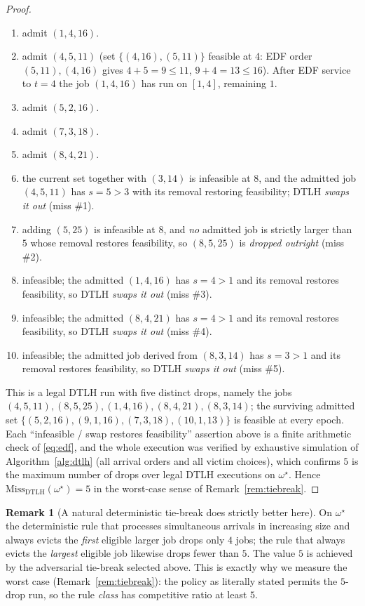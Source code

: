 \documentclass{amsart}
\theoremstyle{definition}
\newtheorem{remark}[theorem]{Remark}
\begin{document}
\begin{proof}
\begin{enumerate}
\item[$t=1$:] admit $(1,4,16)$. \quad
\item[$t=4$:] admit $(4,5,11)$ (set $\{(4,16),(5,11)\}$ feasible at $4$:
EDF order $(5,11),(4,16)$ gives $4+5=9\le11$, $9+4=13\le16$). After EDF service to
$t=4$ the job $(1,4,16)$ has run on $[1,4]$, remaining $1$.
\item[$t=5$:] admit $(5,2,16)$.
\item[$t=7$:] admit $(7,3,18)$.
\item[$t=8$:] admit $(8,4,21)$.
\item[$t=8$, arrival $(8,3,14)$:] the current set together with $(3,14)$ is
infeasible at $8$, and the admitted job $(4,5,11)$ has $s=5>3$ with its removal
restoring feasibility; DTLH \emph{swaps it out} (miss \#1).
\item[$t=8$, arrival $(8,5,25)$:] adding $(5,25)$ is infeasible at $8$, and
\emph{no} admitted job is strictly larger than $5$ whose removal restores
feasibility, so $(8,5,25)$ is \emph{dropped outright} (miss \#2).
\item[$t=9$, arrival $(9,1,16)$:] infeasible; the admitted $(1,4,16)$ has
$s=4>1$ and its removal restores feasibility, so DTLH \emph{swaps it out}
(miss \#3).
\item[$t=9$, arrival $(9,1,13)$:] infeasible; the admitted $(8,4,21)$ has
$s=4>1$ and its removal restores feasibility, so DTLH \emph{swaps it out}
(miss \#4).
\item[$t=10$, arrival $(10,1,13)$:] infeasible; the admitted job derived from
$(8,3,14)$ has $s=3>1$ and its removal restores feasibility, so DTLH
\emph{swaps it out} (miss \#5).
\end{enumerate}
This is a legal DTLH run with five distinct drops, namely the jobs
$(4,5,11),(8,5,25),(1,4,16),(8,4,21),(8,3,14)$; the surviving admitted set
$\{(5,2,16),(9,1,16),(7,3,18),(10,1,13)\}$ is feasible at every epoch.
Each ``infeasible / swap restores feasibility'' assertion above is a finite
arithmetic check of \eqref{eq:edf}, and the whole execution was verified by
exhaustive simulation of Algorithm~\ref{alg:dtlh} (all arrival orders and all
victim choices), which confirms $5$ is the maximum number of drops over legal
DTLH executions on $\omega^\star$. Hence
$\mathrm{Miss}_{\mathrm{DTLH}}(\omega^\star)=5$ in the worst-case sense of
Remark~\ref{rem:tiebreak}.
\end{proof}

\begin{remark}[A natural deterministic tie-break does strictly better here]
On $\omega^\star$ the deterministic rule that processes simultaneous arrivals in
increasing size and always evicts the \emph{first} eligible larger job drops only
$4$ jobs; the rule that always evicts the \emph{largest} eligible job likewise
drops fewer than $5$. The value $5$ is achieved by the adversarial tie-break
selected above. This is exactly why we measure the worst case
(Remark~\ref{rem:tiebreak}): the policy as literally stated permits the
$5$-drop run, so the rule \emph{class} has competitive ratio at least $5$.
\end{remark}
\end{document}
